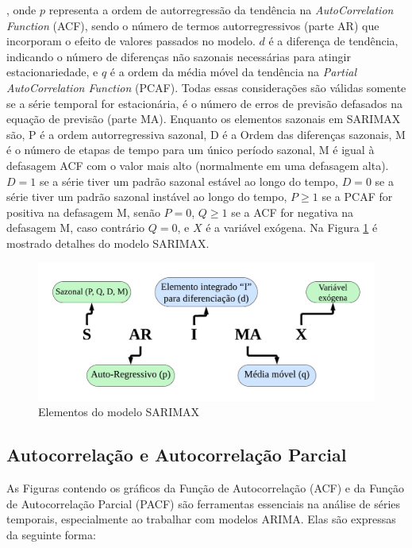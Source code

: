  \noindent, onde $p$ representa a ordem de autorregressão da tendência na \textit{AutoCorrelation Function} (ACF), sendo o número de termos autorregressivos (parte AR) que incorporam o efeito de valores passados no modelo. $d$ é a diferença de tendência, indicando o número de diferenças não sazonais necessárias para atingir estacionariedade, e $q$ é a ordem da média móvel da tendência na \textit{Partial AutoCorrelation Function} (PCAF). Todas essas considerações são válidas somente se a série temporal for estacionária, é o número de erros de previsão defasados na equação de previsão (parte MA). Enquanto os elementos sazonais em SARIMAX são, P é a ordem autorregressiva sazonal, D é a Ordem das diferenças sazonais,
 M é o número de etapas de tempo para um único período sazonal, M é igual à defasagem ACF com o valor mais alto (normalmente em uma defasagem alta). $D=1$ se a série tiver um padrão sazonal estável ao longo do tempo, $D=0$ se a série tiver um padrão sazonal instável ao longo do tempo, $P\geq1$ se a PCAF for positiva na defasagem M, senão $P=0$, $Q\geq1$ se a ACF for negativa na defasagem M, caso contrário $Q=0$, e $X$ é a variável exógena. Na Figura \ref{fig:sarimaxmap} é mostrado detalhes do modelo SARIMAX.
 

 
 \begin{figure}[H]
 	\centering
 	\caption{Elementos do modelo SARIMAX}
 	\label{fig:sarimaxmap}
 	\includegraphics[width=\linewidth]{Modelos/Figuras/sarimax_map.pdf}
 	
 \end{figure}
 
  \subsection{Autocorrela\c c\~ao e Autocorrela\c c\~ao Parcial}
 
As Figuras contendo os gráficos da Função de Autocorrelação (ACF) e da Função de Autocorrelação Parcial (PACF) são ferramentas essenciais na análise de séries temporais, especialmente ao trabalhar com modelos ARIMA. Elas são expressas da seguinte forma:

